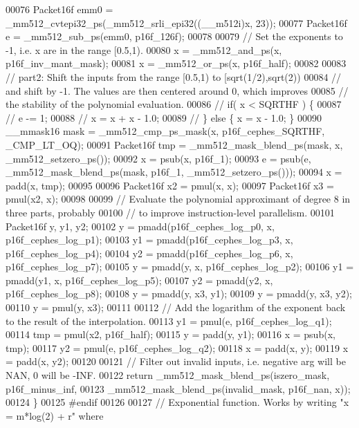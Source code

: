 \begin{DoxyCode}
00076   Packet16f emm0 = \_mm512\_cvtepi32\_ps(\_mm512\_srli\_epi32((\_\_m512i)x, 23));
00077   Packet16f e = \_mm512\_sub\_ps(emm0, p16f\_126f);
00078 
00079   \textcolor{comment}{// Set the exponents to -1, i.e. x are in the range [0.5,1).}
00080   x = \_mm512\_and\_ps(x, p16f\_inv\_mant\_mask);
00081   x = \_mm512\_or\_ps(x, p16f\_half);
00082 
00083   \textcolor{comment}{// part2: Shift the inputs from the range [0.5,1) to [sqrt(1/2),sqrt(2))}
00084   \textcolor{comment}{// and shift by -1. The values are then centered around 0, which improves}
00085   \textcolor{comment}{// the stability of the polynomial evaluation.}
00086   \textcolor{comment}{//   if( x < SQRTHF ) \{}
00087   \textcolor{comment}{//     e -= 1;}
00088   \textcolor{comment}{//     x = x + x - 1.0;}
00089   \textcolor{comment}{//   \} else \{ x = x - 1.0; \}}
00090   \_\_mmask16 mask = \_mm512\_cmp\_ps\_mask(x, p16f\_cephes\_SQRTHF, \_CMP\_LT\_OQ);
00091   Packet16f tmp = \_mm512\_mask\_blend\_ps(mask, x, \_mm512\_setzero\_ps());
00092   x = psub(x, p16f\_1);
00093   e = psub(e, \_mm512\_mask\_blend\_ps(mask, p16f\_1, \_mm512\_setzero\_ps()));
00094   x = padd(x, tmp);
00095 
00096   Packet16f x2 = pmul(x, x);
00097   Packet16f x3 = pmul(x2, x);
00098 
00099   \textcolor{comment}{// Evaluate the polynomial approximant of degree 8 in three parts, probably}
00100   \textcolor{comment}{// to improve instruction-level parallelism.}
00101   Packet16f y, y1, y2;
00102   y = pmadd(p16f\_cephes\_log\_p0, x, p16f\_cephes\_log\_p1);
00103   y1 = pmadd(p16f\_cephes\_log\_p3, x, p16f\_cephes\_log\_p4);
00104   y2 = pmadd(p16f\_cephes\_log\_p6, x, p16f\_cephes\_log\_p7);
00105   y = pmadd(y, x, p16f\_cephes\_log\_p2);
00106   y1 = pmadd(y1, x, p16f\_cephes\_log\_p5);
00107   y2 = pmadd(y2, x, p16f\_cephes\_log\_p8);
00108   y = pmadd(y, x3, y1);
00109   y = pmadd(y, x3, y2);
00110   y = pmul(y, x3);
00111 
00112   \textcolor{comment}{// Add the logarithm of the exponent back to the result of the interpolation.}
00113   y1 = pmul(e, p16f\_cephes\_log\_q1);
00114   tmp = pmul(x2, p16f\_half);
00115   y = padd(y, y1);
00116   x = psub(x, tmp);
00117   y2 = pmul(e, p16f\_cephes\_log\_q2);
00118   x = padd(x, y);
00119   x = padd(x, y2);
00120 
00121   \textcolor{comment}{// Filter out invalid inputs, i.e. negative arg will be NAN, 0 will be -INF.}
00122   \textcolor{keywordflow}{return} \_mm512\_mask\_blend\_ps(iszero\_mask, p16f\_minus\_inf,
00123                               \_mm512\_mask\_blend\_ps(invalid\_mask, p16f\_nan, x));
00124 \}
00125 \textcolor{preprocessor}{#endif}
00126 
00127 \textcolor{comment}{// Exponential function. Works by writing "x = m*log(2) + r" where}

\end{DoxyCode}
